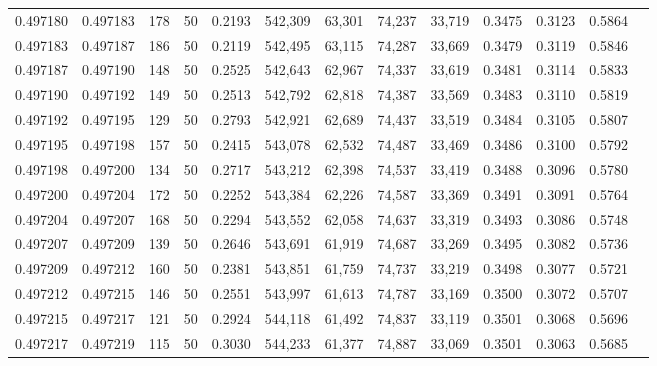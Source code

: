 \begin{tabular}{rrrrrrrrrrrrr}
0.497180 & 0.497183 &   178 &  50 &                                     0.2193 & 542,309 &  63,301 &  74,237 &  33,719 & 0.3475 & 0.3123 & 0.5864 \\
0.497183 & 0.497187 &   186 &  50 &                                     0.2119 & 542,495 &  63,115 &  74,287 &  33,669 & 0.3479 & 0.3119 & 0.5846 \\
0.497187 & 0.497190 &   148 &  50 &                                     0.2525 & 542,643 &  62,967 &  74,337 &  33,619 & 0.3481 & 0.3114 & 0.5833 \\
0.497190 & 0.497192 &   149 &  50 &                                     0.2513 & 542,792 &  62,818 &  74,387 &  33,569 & 0.3483 & 0.3110 & 0.5819 \\
0.497192 & 0.497195 &   129 &  50 &                                     0.2793 & 542,921 &  62,689 &  74,437 &  33,519 & 0.3484 & 0.3105 & 0.5807 \\
0.497195 & 0.497198 &   157 &  50 &                                     0.2415 & 543,078 &  62,532 &  74,487 &  33,469 & 0.3486 & 0.3100 & 0.5792 \\
0.497198 & 0.497200 &   134 &  50 &                                     0.2717 & 543,212 &  62,398 &  74,537 &  33,419 & 0.3488 & 0.3096 & 0.5780 \\
0.497200 & 0.497204 &   172 &  50 &                                     0.2252 & 543,384 &  62,226 &  74,587 &  33,369 & 0.3491 & 0.3091 & 0.5764 \\
0.497204 & 0.497207 &   168 &  50 &                                     0.2294 & 543,552 &  62,058 &  74,637 &  33,319 & 0.3493 & 0.3086 & 0.5748 \\
0.497207 & 0.497209 &   139 &  50 &                                     0.2646 & 543,691 &  61,919 &  74,687 &  33,269 & 0.3495 & 0.3082 & 0.5736 \\
0.497209 & 0.497212 &   160 &  50 &                                     0.2381 & 543,851 &  61,759 &  74,737 &  33,219 & 0.3498 & 0.3077 & 0.5721 \\
0.497212 & 0.497215 &   146 &  50 &                                     0.2551 & 543,997 &  61,613 &  74,787 &  33,169 & 0.3500 & 0.3072 & 0.5707 \\
0.497215 & 0.497217 &   121 &  50 &                                     0.2924 & 544,118 &  61,492 &  74,837 &  33,119 & 0.3501 & 0.3068 & 0.5696 \\
0.497217 & 0.497219 &   115 &  50 &                                     0.3030 & 544,233 &  61,377 &  74,887 &  33,069 & 0.3501 & 0.3063 & 0.5685 \\

\end{tabular}
